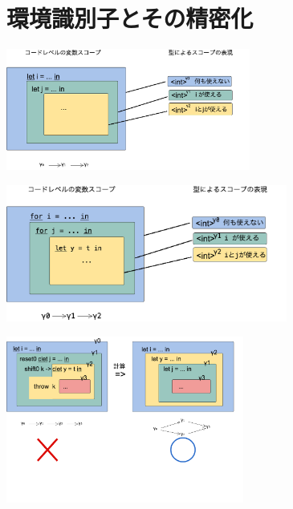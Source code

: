 
\section{環境識別子とその精密化}


\begin{center}
  \includegraphics[clip,height=4cm]{./img/ec_let.png}
\end{center}

\begin{center}
  \includegraphics[clip,height=4.5cm]{./img/ec_for.png}
\end{center}



\begin{center}
  \includegraphics[clip,height=5.5cm]{./img/ecex_let.png}
\end{center}


